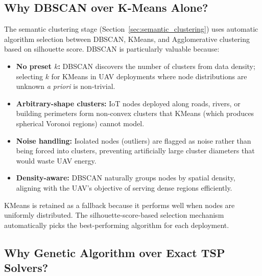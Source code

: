 \documentclass[12pt, a4paper, oneside]{report}
\begin{document}
\subsection{Why DBSCAN over K-Means Alone?}

The semantic clustering stage (Section~\ref{sec:semantic_clustering}) uses automatic algorithm selection between DBSCAN, KMeans, and Agglomerative clustering based on silhouette score. DBSCAN is particularly valuable because:
\begin{itemize}
    \item \textbf{No preset $k$:} DBSCAN discovers the number of clusters from data density; selecting $k$ for KMeans in UAV deployments where node distributions are unknown \textit{a priori} is non-trivial.
    \item \textbf{Arbitrary-shape clusters:} IoT nodes deployed along roads, rivers, or building perimeters form non-convex clusters that KMeans (which produces spherical Voronoi regions) cannot model.
    \item \textbf{Noise handling:} Isolated nodes (outliers) are flagged as noise rather than being forced into clusters, preventing artificially large cluster diameters that would waste UAV energy.
    \item \textbf{Density-aware:} DBSCAN naturally groups nodes by spatial density, aligning with the UAV's objective of serving dense regions efficiently.
\end{itemize}
KMeans is retained as a fallback because it performs well when nodes are uniformly distributed. The silhouette-score-based selection mechanism automatically picks the best-performing algorithm for each deployment.

\subsection{Why Genetic Algorithm over Exact TSP Solvers?}
\end{document}
